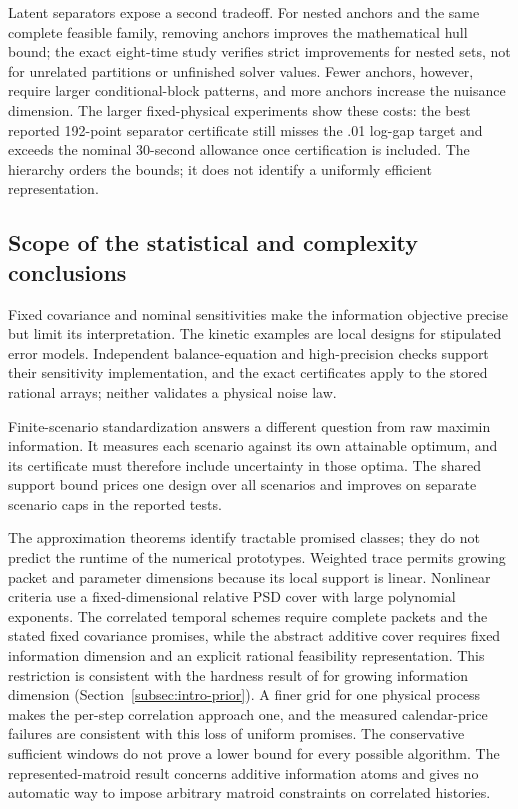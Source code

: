 Latent separators expose a second tradeoff. For nested anchors and the same
complete feasible family, removing anchors improves the mathematical hull
bound; the exact eight-time study verifies strict improvements for nested
sets, not for unrelated partitions or unfinished solver values. Fewer anchors,
however, require larger conditional-block patterns, and more anchors increase
the nuisance dimension. The larger fixed-physical experiments show these
costs: the best reported 192-point separator certificate still misses the
.01 log-gap target and exceeds the nominal 30-second allowance once
certification is included. The hierarchy orders the bounds; it does not
identify a uniformly efficient representation.

\subsection{Scope of the statistical and complexity conclusions}

Fixed covariance and nominal sensitivities make the information objective
precise but limit its interpretation. The kinetic examples are local designs
for stipulated error models. Independent balance-equation and high-precision
checks support their sensitivity implementation, and the exact certificates
apply to the stored rational arrays; neither validates a physical noise law.

Finite-scenario standardization answers a different question from raw maximin
information. It measures each scenario against its own attainable optimum,
and its certificate must therefore include uncertainty in those optima. The
shared support bound prices one design over all scenarios and improves on
separate scenario caps in the reported tests.

The approximation theorems identify tractable promised classes; they do not
predict the runtime of the numerical prototypes. Weighted trace permits
growing packet and parameter dimensions because its local support is linear.
Nonlinear criteria use a fixed-dimensional relative PSD cover with large
polynomial exponents. The correlated temporal schemes require complete
packets and the stated fixed covariance promises, while the abstract additive
cover requires fixed information dimension and an explicit rational
feasibility representation. This restriction is consistent with the
hardness result of \citet{BansalXu2026} for growing information dimension
(Section~\ref{subsec:intro-prior}).
A finer grid for one physical process makes the per-step correlation
approach one, and the measured calendar-price failures are consistent with
this loss of uniform promises. The conservative sufficient windows do not
prove a lower bound for every possible algorithm. The represented-matroid
result concerns additive information atoms and gives no automatic way to
impose arbitrary matroid constraints on correlated histories.

